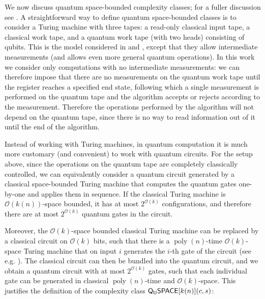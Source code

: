 \documentclass[a4paper,UKenglish]{lipics-v2016}
\newcommand\QSPACE{{\sf{Q_{U}SPACE}}}
\DeclareMathOperator{\poly}{poly}
\begin{document}
We now discuss quantum space-bounded complexity classes; for a fuller discussion see \cite{Watrous09}. A straightforward way to define quantum space-bounded classes is to consider a Turing machine with three tapes: a read-only classical input tape, a classical work tape, and a quantum work tape (with two heads) consisting of qubits. This is the model considered in \cite{tashma} and \cite{Watrous03}, except that they allow intermediate measurements (and \cite{Watrous03} allows even more general quantum operations). In this work we consider only computations with no intermediate measurements: we can therefore impose that there are no measurements on the quantum work tape until the register reaches a specified end state, following which a single measurement is performed on the quantum tape and the algorithm accepts or rejects according to the measurement. Therefore the operations performed by the algorithm will not depend on the quantum tape, since there is no way to read information out of it until the end of the algorithm.

Instead of working with Turing machines, in quantum computation it is much more customary (and convenient) to work with quantum circuits. For the setup above, since the operations on the quantum tape are completely classically controlled, we can equivalently consider a quantum circuit generated by a classical space-bounded Turing machine that computes the quantum gates one-by-one and applies them in sequence. If the classical Turing machine is $\mathcal{O}(k(n))$-space bounded, it has at most $2^{\mathcal{O}(k)}$ configurations, and therefore there are at most $2^{\mathcal{O}(k)}$ quantum gates in the circuit. 

Moreover, the $\mathcal{O}(k)$-space bounded classical Turing machine can be replaced by a classical circuit on $\mathcal{O}(k)$ bits, such that there is a $\poly(n)$-time $\mathcal{O}(k)$-space Turing machine that on input $i$ generates the $i$-th gate of the circuit (see e.g. \cite[Section~6.8]{ab09}). The classical circuit can then be bundled into the quantum circuit, and we obtain a quantum circuit with at most $2^{\mathcal{O}(k)}$ gates, such that each individual gate can be generated in classical $\poly(n)$-time and $\mathcal{O}(k)$-space. This justifies the definition of the complexity class $\QSPACE[k(n)](c,s)$:
\end{document}
